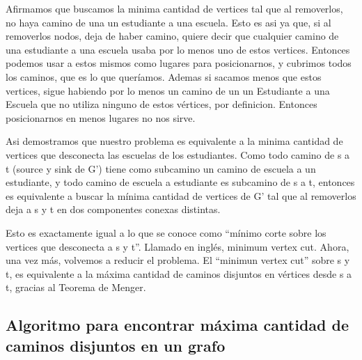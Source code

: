 \par{Afirmamos que buscamos la minima cantidad de vertices tal que al removerlos, no haya camino de una un estudiante a una escuela. 
Esto es asi ya que, si al removerlos nodos, deja de haber camino, quiere decir que cualquier camino de una estudiante a una escuela usaba por lo menos uno de estos vertices. 
Entonces podemos usar a estos mismos como lugares para posicionarnos, y cubrimos todos los caminos, que es lo que queríamos. Ademas si sacamos menos que estos vertices, sigue habiendo por lo menos un camino de un un Estudiante  a una Escuela que no utiliza ninguno de estos vértices, por definicion. Entonces posicionarnos en menos lugares no nos sirve. }
\par{
Asi demostramos que nuestro problema es equivalente a la minima cantidad de vertices que desconecta las escuelas de los estudiantes. 
Como todo camino de s a t (source y sink de G’) tiene como subcamino un camino de escuela a un estudiante, y todo camino de escuela a estudiante es subcamino de s a t, entonces es equivalente a buscar la mínima cantidad de vertices de G’ tal que al removerlos deja a s y t en dos componentes conexas distintas.}
\par{
Esto es exactamente igual a lo que se conoce como “mínimo corte sobre los vertices que desconecta a s y t”. Llamado en inglés, minimum vertex cut.
Ahora, una vez más, volvemos a reducir el problema. El “minimun vertex cut”  sobre s y t, es equivalente a la máxima cantidad de caminos disjuntos en vértices desde s a t, gracias al Teorema de Menger.}

\subsection{Algoritmo para encontrar máxima cantidad de caminos disjuntos en un grafo}

